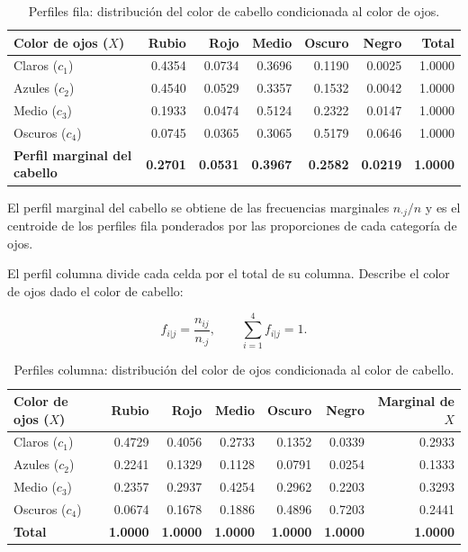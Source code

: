 \begin{table}[H]
\centering
\small
\setlength{\tabcolsep}{5pt}
\renewcommand{\arraystretch}{1.15}
\begin{tabular}{|l|r|r|r|r|r|r|}
\hline
\textbf{Color de ojos ($X$)} & \textbf{Rubio} & \textbf{Rojo} & \textbf{Medio} & \textbf{Oscuro} & \textbf{Negro} & \textbf{Total} \\ \hline
Claros ($c_1$)  & 0.4354 & 0.0734 & 0.3696 & 0.1190 & 0.0025 & 1.0000 \\ \hline
Azules ($c_2$)  & 0.4540 & 0.0529 & 0.3357 & 0.1532 & 0.0042 & 1.0000 \\ \hline
Medio ($c_3$)   & 0.1933 & 0.0474 & 0.5124 & 0.2322 & 0.0147 & 1.0000 \\ \hline
Oscuros ($c_4$) & 0.0745 & 0.0365 & 0.3065 & 0.5179 & 0.0646 & 1.0000 \\ \hline
\textbf{Perfil marginal del cabello} & \textbf{0.2701} & \textbf{0.0531} & \textbf{0.3967} & \textbf{0.2582} & \textbf{0.0219} & \textbf{1.0000} \\ \hline
\end{tabular}
\caption{Perfiles fila: distribución del color de cabello condicionada al color de ojos.}
\label{tab:perfil-fila-ojos-cabello}
\end{table}

El perfil marginal del cabello se obtiene de las frecuencias marginales $n_{\cdot j}/n$ y es el centroide de los perfiles fila ponderados por las proporciones de cada categoría de ojos.

El perfil columna divide cada celda por el total de su columna. Describe el color de ojos dado el color de cabello:

\begin{equation*}
f_{i|j}=\frac{n_{ij}}{n_{\cdot j}},\qquad \sum_{i=1}^{4}f_{i|j}=1.
\end{equation*}

\begin{table}[H]
\centering
\small
\setlength{\tabcolsep}{5pt}
\renewcommand{\arraystretch}{1.15}
\begin{tabular}{|l|r|r|r|r|r|r|}
\hline
\textbf{Color de ojos ($X$)} & \textbf{Rubio} & \textbf{Rojo} & \textbf{Medio} & \textbf{Oscuro} & \textbf{Negro} & \textbf{Marginal de $X$} \\ \hline
Claros ($c_1$)  & 0.4729 & 0.4056 & 0.2733 & 0.1352 & 0.0339 & 0.2933 \\ \hline
Azules ($c_2$)  & 0.2241 & 0.1329 & 0.1128 & 0.0791 & 0.0254 & 0.1333 \\ \hline
Medio ($c_3$)   & 0.2357 & 0.2937 & 0.4254 & 0.2962 & 0.2203 & 0.3293 \\ \hline
Oscuros ($c_4$) & 0.0674 & 0.1678 & 0.1886 & 0.4896 & 0.7203 & 0.2441 \\ \hline
\textbf{Total} & \textbf{1.0000} & \textbf{1.0000} & \textbf{1.0000} & \textbf{1.0000} & \textbf{1.0000} & \textbf{1.0000} \\ \hline
\end{tabular}
\caption{Perfiles columna: distribución del color de ojos condicionada al color de cabello.}
\label{tab:perfil-columna-ojos-cabello}
\end{table}

